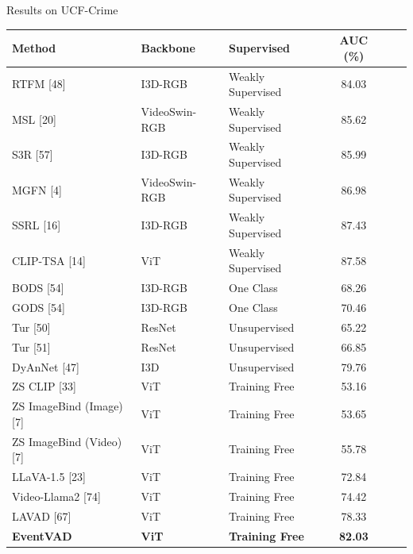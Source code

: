 \documentclass[aspectratio=169,xcolor=dvipsnames]{beamer}
\begin{document}
	
	\begin{frame}{Results on UCF-Crime}
		\scriptsize
		
		\begin{table}
			\centering
			\setlength{\tabcolsep}{4pt}
			\renewcommand{\arraystretch}{1.15}
			\begin{tabular}{l l l c c c}
				\hline
				\textbf{Method} & \textbf{Backbone} & \textbf{Supervised} & \textbf{AUC (\%)} \\
				\hline
				RTFM [48] & I3D-RGB & Weakly Supervised & 84.03 \\
				MSL [20] & VideoSwin-RGB & Weakly Supervised & 85.62 \\
				S3R [57] & I3D-RGB & Weakly Supervised & 85.99 \\
				MGFN [4] & VideoSwin-RGB & Weakly Supervised & 86.98 \\
				SSRL [16] & I3D-RGB & Weakly Supervised & 87.43 \\
				CLIP-TSA [14] & ViT & Weakly Supervised & 87.58 \\
				\hline
				BODS [54] & I3D-RGB & One Class & 68.26 \\
				GODS [54] & I3D-RGB & One Class & 70.46 \\
				\hline
				Tur [50] & ResNet & Unsupervised & 65.22 \\
				Tur [51] & ResNet & Unsupervised & 66.85 \\
				DyAnNet [47] & I3D & Unsupervised & 79.76 \\
				\hline
				ZS CLIP [33] & ViT & Training Free & 53.16 \\
				ZS ImageBind (Image) [7] & ViT & Training Free & 53.65 \\
				ZS ImageBind (Video) [7] & ViT & Training Free & 55.78 \\
				LLaVA-1.5 [23] & ViT & Training Free & 72.84 \\
				Video-Llama2 [74] & ViT & Training Free & 74.42 \\
				LAVAD [67] & ViT & Training Free & 78.33 \\
				\textbf{EventVAD} & \textbf{ViT} & \textbf{Training Free} & \textbf{82.03} \\
				\hline
			\end{tabular}
		\end{table}
		
		
	\end{frame}
	
\end{document}
